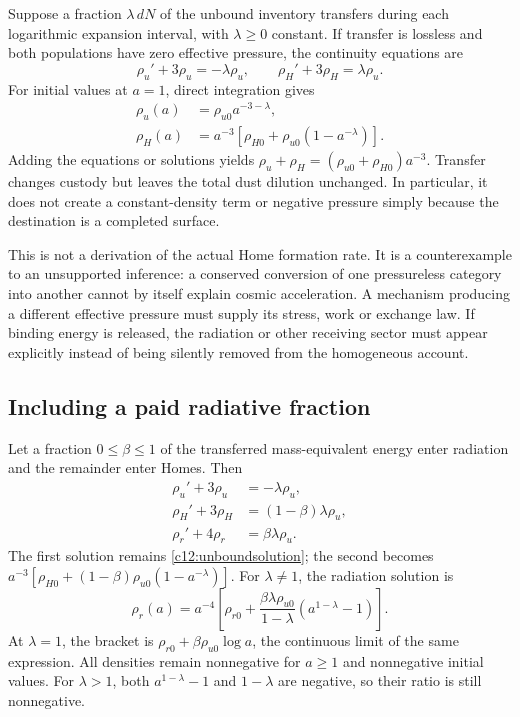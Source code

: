 Suppose a fraction $\lambda\,dN$ of the unbound inventory transfers during each logarithmic expansion interval, with $\lambda\geq0$ constant. If transfer is lossless and both populations have zero effective pressure, the continuity equations are
\begin{equation}
 \rho_u'+3\rho_u=-\lambda\rho_u,\qquad
 \rho_H'+3\rho_H=\lambda\rho_u.
 \label{c12:dusttransfer}
\end{equation}
For initial values at $a=1$, direct integration gives
\begin{align}
 \rho_u(a)&=\rho_{u0}a^{-3-\lambda},\label{c12:unboundsolution}\\
 \rho_H(a)&=a^{-3}\left[\rho_{H0}+\rho_{u0}(1-a^{-\lambda})\right].
 \label{c12:homesolution}
\end{align}
Adding the equations or solutions yields $\rho_u+\rho_H=(\rho_{u0}+\rho_{H0})a^{-3}$. Transfer changes custody but leaves the total dust dilution unchanged. In particular, it does not create a constant-density term or negative pressure simply because the destination is a completed surface.

This is not a derivation of the actual Home formation rate. It is a counterexample to an unsupported inference: a conserved conversion of one pressureless category into another cannot by itself explain cosmic acceleration. A mechanism producing a different effective pressure must supply its stress, work or exchange law. If binding energy is released, the radiation or other receiving sector must appear explicitly instead of being silently removed from the homogeneous account.

\subsection{Including a paid radiative fraction}
Let a fraction $0\leq\beta\leq1$ of the transferred mass-equivalent energy enter radiation and the remainder enter Homes. Then
\begin{align}
 \rho_u'+3\rho_u&=-\lambda\rho_u,\label{c12:transferu}\\
 \rho_H'+3\rho_H&=(1-\beta)\lambda\rho_u,\label{c12:transferhome}\\
 \rho_r'+4\rho_r&=\beta\lambda\rho_u.
 \label{c12:transferradiation}
\end{align}
The first solution remains \eqref{c12:unboundsolution}; the second becomes $a^{-3}[\rho_{H0}+(1-\beta)\rho_{u0}(1-a^{-\lambda})]$. For $\lambda\ne1$, the radiation solution is
\begin{equation}
 \rho_r(a)=a^{-4}\left[
 \rho_{r0}+\frac{\beta\lambda\rho_{u0}}{1-\lambda}
                 (a^{1-\lambda}-1)\right].
 \label{c12:radiationsolution}
\end{equation}
At $\lambda=1$, the bracket is $\rho_{r0}+\beta\rho_{u0}\log a$, the continuous limit of the same expression. All densities remain nonnegative for $a\geq1$ and nonnegative initial values. For $\lambda>1$, both $a^{1-\lambda}-1$ and $1-\lambda$ are negative, so their ratio is still nonnegative.

